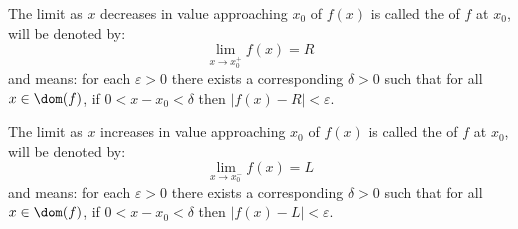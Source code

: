 \begin{node}\label{calculus:differential:limits-0001}%
\begin{definition}\label{calculus:differential:limits-0000}%
The limit as $x$ decreases in value approaching $x_{0}$ of $f(x)$ is
called the  of $f$ at $x_{0}$, will be denoted by:
\begin{equation*}
\lim_{x\to x_{0}^{+}}f(x)=R
\end{equation*}
and means: for each $\varepsilon>0$ there exists a corresponding
$\delta>0$ such that for all $x\in\dom(f)$, if $0<x-x_{0}<\delta$ then
$|f(x)-R|<\varepsilon$. 
\end{definition}

\begin{definition}
The limit as $x$ increases in value approaching $x_{0}$ of $f(x)$ is
called the  of $f$ at $x_{0}$, will be denoted by:
\begin{equation*}
\lim_{x\to x_{0}^{-}}f(x)=L
\end{equation*}
and means: for each $\varepsilon>0$ there exists a corresponding
$\delta>0$ such that for all $x\in\dom(f)$, if $0<x-x_{0}<\delta$ then
$|f(x)-L|<\varepsilon$. 
\end{definition}
\end{node}


